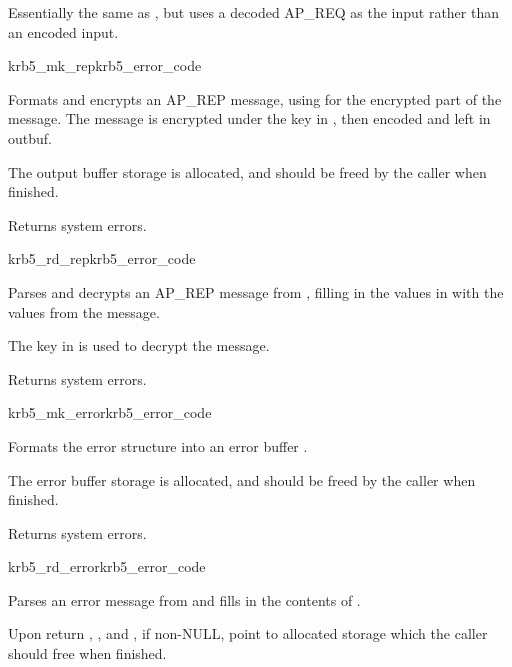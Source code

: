 Essentially the same as , but uses a decoded AP_REQ
as the input rather than an encoded input.

\begin{funcdecl}{krb5_mk_rep}{krb5_error_code}{\funcin}
\funcout
{}
\end{funcdecl}

Formats and encrypts an AP_REP message, using  for the
encrypted part of the message.  The message is encrypted under the key
in , then encoded and left in outbuf.

The output buffer storage is allocated, and should be freed by the
caller when finished.

Returns system errors.

\begin{funcdecl}{krb5_rd_rep}{krb5_error_code}{\funcin}
\funcout
{}
\end{funcdecl}

Parses and decrypts an AP_REP message from , filling in
the values in  with the values from the message.

The key in  is used to decrypt the message.

Returns system errors.

\begin{funcdecl}{krb5_mk_error}{krb5_error_code}{\funcin}
\funcout
{}
\end{funcdecl}

Formats the error structure  into an error buffer
.

The error buffer storage is allocated, and should be freed by the
caller when finished.

Returns system errors.

\begin{funcdecl}{krb5_rd_error}{krb5_error_code}{\funcin}
\funcout
{}
\end{funcdecl}

Parses an error message from  and fills in the
contents of .

Upon return ,
, and
, if non-NULL, point to allocated
storage which the caller should free when finished.

